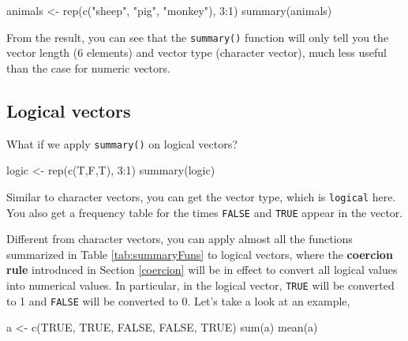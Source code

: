 \documentclass[
]{book}
\newenvironment{Shaded}{\begin{snugshade}}{\end{snugshade}}
\newcommand{\ConstantTok}[1]{\textcolor[rgb]{0.00,0.00,0.00}{#1}}
\newcommand{\DecValTok}[1]{\textcolor[rgb]{0.00,0.00,0.81}{#1}}
\newcommand{\FunctionTok}[1]{\textcolor[rgb]{0.00,0.00,0.00}{#1}}
\newcommand{\NormalTok}[1]{#1}
\newcommand{\OtherTok}[1]{\textcolor[rgb]{0.56,0.35,0.01}{#1}}
\newcommand{\SpecialCharTok}[1]{\textcolor[rgb]{0.00,0.00,0.00}{#1}}
\newcommand{\StringTok}[1]{\textcolor[rgb]{0.31,0.60,0.02}{#1}}
\begin{document}
\begin{Shaded}
\begin{Highlighting}[]
\NormalTok{animals }\OtherTok{\textless{}{-}} \FunctionTok{rep}\NormalTok{(}\FunctionTok{c}\NormalTok{(}\StringTok{"sheep"}\NormalTok{, }\StringTok{"pig"}\NormalTok{, }\StringTok{"monkey"}\NormalTok{), }\DecValTok{3}\SpecialCharTok{:}\DecValTok{1}\NormalTok{)}
\FunctionTok{summary}\NormalTok{(animals)}
\end{Highlighting}
\end{Shaded}

From the result, you can see that the \texttt{summary()} function will only tell you the vector length (6 elements) and vector type (character vector), much less useful than the case for numeric vectors.

\hypertarget{func-logical-vector}{%
\subsection{Logical vectors}\label{func-logical-vector}}

What if we apply \texttt{summary()} on logical vectors?

\begin{Shaded}
\begin{Highlighting}[]
\NormalTok{logic }\OtherTok{\textless{}{-}} \FunctionTok{rep}\NormalTok{(}\FunctionTok{c}\NormalTok{(T,F,T), }\DecValTok{3}\SpecialCharTok{:}\DecValTok{1}\NormalTok{)}
\FunctionTok{summary}\NormalTok{(logic)}
\end{Highlighting}
\end{Shaded}

Similar to character vectors, you can get the vector type, which is \texttt{logical} here. You also get a frequency table for the times \texttt{FALSE} and \texttt{TRUE} appear in the vector.

Different from character vectors, you can apply almost all the functions summarized in Table \ref{tab:summaryFuns} to logical vectors, where the \textbf{coercion rule} introduced in Section \ref{coercion} will be in effect to convert all logical values into numerical values. In particular, in the logical vector, \texttt{TRUE} will be converted to 1 and \texttt{FALSE} will be converted to 0. Let's take a look at an example,

\begin{Shaded}
\begin{Highlighting}[]
\NormalTok{a }\OtherTok{\textless{}{-}} \FunctionTok{c}\NormalTok{(}\ConstantTok{TRUE}\NormalTok{, }\ConstantTok{TRUE}\NormalTok{, }\ConstantTok{FALSE}\NormalTok{, }\ConstantTok{FALSE}\NormalTok{, }\ConstantTok{TRUE}\NormalTok{)}
\FunctionTok{sum}\NormalTok{(a)}
\FunctionTok{mean}\NormalTok{(a)}
\end{Highlighting}
\end{Shaded}
\end{document}
